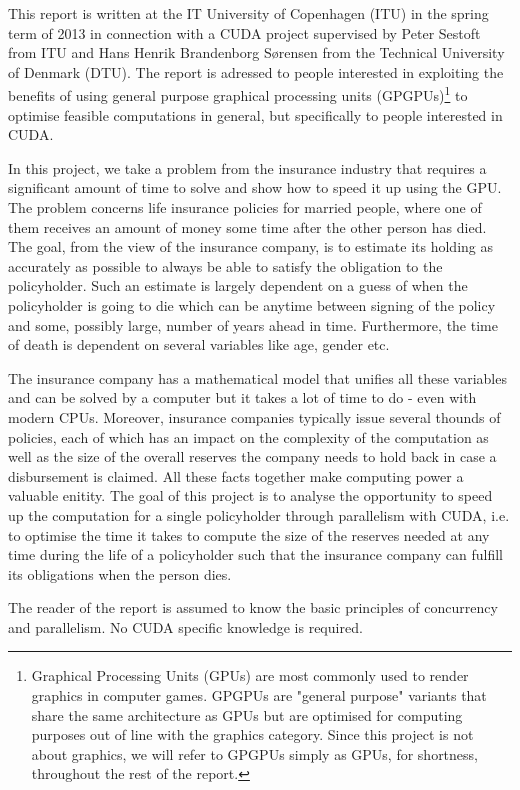 This report is written at the IT University of Copenhagen (ITU) in the spring term of 2013 in connection with a CUDA project supervised by Peter Sestoft from ITU and Hans Henrik Brandenborg Sørensen from the Technical University of Denmark (DTU). The report is adressed to people interested in exploiting the benefits of using general purpose graphical processing units (GPGPUs)\footnote{Graphical Processing Units (GPUs) are most commonly used to render graphics in computer games. GPGPUs are "general purpose" variants that share the same architecture as GPUs but are optimised for computing purposes out of line with the graphics category. Since this project is not about graphics, we will refer to GPGPUs simply as GPUs, for shortness, throughout the rest of the report.} to optimise feasible computations in general, but specifically to people interested in CUDA.

In this project, we take a problem from the insurance industry that requires a significant amount of time to solve and show how to speed it up using the GPU. The problem concerns life insurance policies for married people, where one of them receives an amount of money some time after the other person has died. The goal, from the view of the insurance company, is to estimate its holding as accurately as possible to always be able to satisfy the obligation to the policyholder. Such an estimate is largely dependent on a guess of when the policyholder is going to die which can be anytime between signing of the policy and some, possibly large, number of years ahead in time. Furthermore, the time of death is dependent on several variables like age, gender etc. 

The insurance company has a mathematical model that unifies all these variables and can be solved by a computer but it takes a lot of time to do - even with modern CPUs. Moreover, insurance companies typically issue several thounds of policies, each of which has an impact on the complexity of the computation as well as the size of the overall reserves the company needs to hold back in case a disbursement is claimed. All these facts together make computing power a valuable enitity. The goal of this project is to analyse the opportunity to speed up the computation for a single policyholder through parallelism with CUDA, i.e. to optimise the time it takes to compute the size of the reserves needed at any time during the life of a policyholder such that the insurance company can fulfill its obligations when the person dies.

The reader of the report is assumed to know the basic principles of concurrency and parallelism. No CUDA specific knowledge is required.